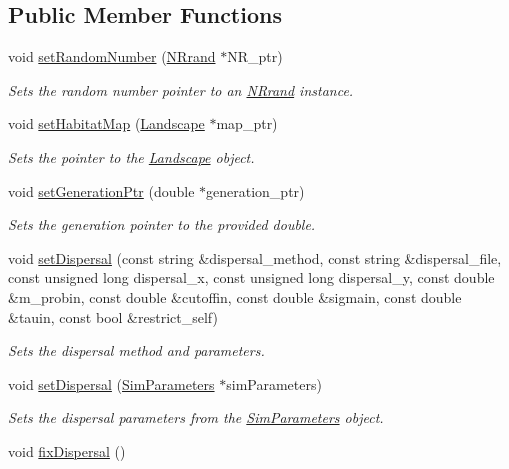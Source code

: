 \subsection*{Public Member Functions}
\begin{DoxyCompactItemize}
\item 
void \hyperlink{class_dispersal_coordinator_a3cfdb18edbf4dd1c45d0cf6af47f91fe}{set\+Random\+Number} (\hyperlink{class_n_rrand}{N\+Rrand} $\ast$N\+R\+\_\+ptr)
\begin{DoxyCompactList}\small\item\em Sets the random number pointer to an \hyperlink{class_n_rrand}{N\+Rrand} instance. \end{DoxyCompactList}\item 
void \hyperlink{class_dispersal_coordinator_a0db146f56de14e0b4a095526a7b6c779}{set\+Habitat\+Map} (\hyperlink{class_landscape}{Landscape} $\ast$map\+\_\+ptr)
\begin{DoxyCompactList}\small\item\em Sets the pointer to the \hyperlink{class_landscape}{Landscape} object. \end{DoxyCompactList}\item 
void \hyperlink{class_dispersal_coordinator_aad9a57afe4629674c958e4d0de4d2451}{set\+Generation\+Ptr} (double $\ast$generation\+\_\+ptr)
\begin{DoxyCompactList}\small\item\em Sets the generation pointer to the provided double. \end{DoxyCompactList}\item 
void \hyperlink{class_dispersal_coordinator_ab0face98d80793e7f4a8ad1bf4dfe3f1}{set\+Dispersal} (const string \&dispersal\+\_\+method, const string \&dispersal\+\_\+file, const unsigned long dispersal\+\_\+x, const unsigned long dispersal\+\_\+y, const double \&m\+\_\+probin, const double \&cutoffin, const double \&sigmain, const double \&tauin, const bool \&restrict\+\_\+self)
\begin{DoxyCompactList}\small\item\em Sets the dispersal method and parameters. \end{DoxyCompactList}\item 
void \hyperlink{class_dispersal_coordinator_a8504699586755df070b44da71ea346a5}{set\+Dispersal} (\hyperlink{struct_sim_parameters}{Sim\+Parameters} $\ast$sim\+Parameters)
\begin{DoxyCompactList}\small\item\em Sets the dispersal parameters from the \hyperlink{struct_sim_parameters}{Sim\+Parameters} object. \end{DoxyCompactList}\item 
void \hyperlink{class_dispersal_coordinator_a588b959feff178953c37bfeae7aa8529}{fix\+Dispersal} ()\hypertarget{class_dispersal_coordinator_a588b959feff178953c37bfeae7aa8529}{}\label{class_dispersal_coordinator_a588b959feff178953c37bfeae7aa8529}


\end{DoxyCompactItemize}
